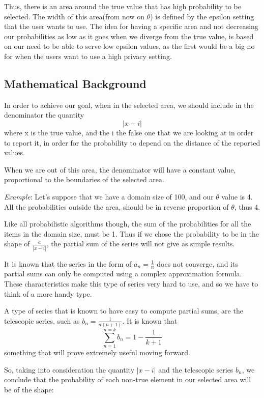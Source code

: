 Thus, there is an area around the true value that has high probability to be selected. The width of this area(from now on $\theta$) is defined by the epsilon setting that the user wants to use. The idea for having a specific area and not decreasing our probabilities as low as it goes when we diverge from the true value, is based on our need to be able to serve low epsilon values, as the first would be a big no for when the users want to use a high privacy setting.

\subsection{Mathematical Background}

In order to achieve our goal, when in the selected area, we should include in the denominator the quantity 
$$
|x - i|
$$
where x is the true value, and the i the false one that we are looking at in order to report it, in order for the probability to depend on the distance of the reported values.

When we are out of this area, the denominator will have a constant value, proportional to the boundaries of the selected area. 

\emph{Example}: Let's suppose that we have a domain size of 100, and our $\theta$ value is 4. All the probabilities outside the area, should be in reverse proportion of $\theta$, thus 4.

Like all probabilistic algorithms though, the sum of the probabilities for all the items in the domain size, must be 1. Thus if we chose the probability to be in the shape of $\frac{a}{|x-i|}$, the partial sum of the series will not give as simple results.

It is known that the series in the form of $a_n = \frac{1}{n}$ does not converge, and its partial sums can only be computed using a complex approximation formula. These characteristics make this type of series very hard to use, and so we have to think of a more handy type.


A type of series that is known to have easy to compute partial sums, are the telescopic series, such as $b_n = \frac{1}{n (n+1)}$. It is known that 
$$
\sum_{n = 1}^{n = k} b_n = 1 - \frac{1}{k + 1}
$$
something that will prove extremely useful moving forward.

So, taking into consideration the quantity $|x - i|$ and the telescopic series $b_n$, we conclude that the probability of each non-true element in our selected area will be of the shape:

